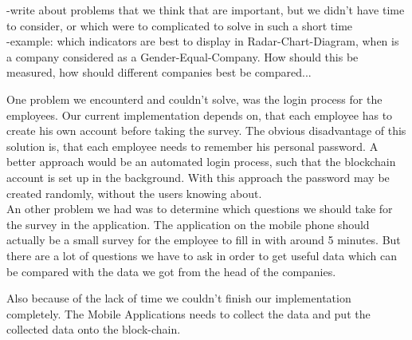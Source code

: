 -write about problems that we think that are important, but we didn't have time to consider, or which were to complicated to solve in such a short time\\
-example: which indicators are best to display in Radar-Chart-Diagram, when is a company considered as a Gender-Equal-Company. How should this be measured, how should different companies best be compared...

One problem we encounterd and couldn't solve, was the login process for the employees. Our current implementation depends on, that each employee has to create his own account before taking the survey.
The obvious disadvantage of this solution is, that each employee needs to remember his personal password. A better approach would be an automated login process, such that the blockchain account is set up in the
background. With this approach the password may be created randomly, without the users knowing about.\\

An other problem we had was to determine which questions we should take for the survey in the application. The application on the mobile phone should actually be a small survey for the employee to fill in with around 5 minutes. But there are a lot of questions we have to ask in order to get useful data which can be compared with the data we got from the head of the companies. 

Also because of the lack of time we couldn't finish our implementation completely. The Mobile Applications needs to collect the data and put the collected data onto the block-chain.

